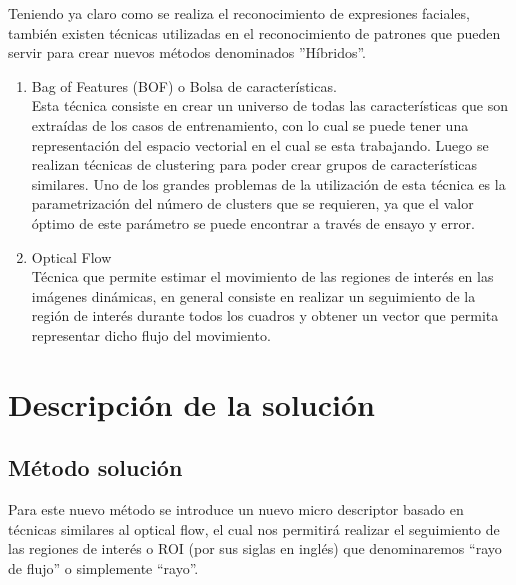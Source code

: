 \documentclass{article}
\begin{document}
    Teniendo ya claro como se realiza el reconocimiento de expresiones faciales, también existen técnicas utilizadas en el reconocimiento de patrones que pueden servir para crear nuevos métodos denominados ''Híbridos''.
    \begin{enumerate}
    \item Bag of Features (BOF) o Bolsa de características.\\
Esta técnica consiste en crear un universo de todas las características que son extraídas de los casos de entrenamiento, con lo cual se puede tener una representación del espacio vectorial en el cual se esta trabajando. Luego se realizan técnicas de clustering para poder crear grupos de características similares. 
Uno de los grandes problemas de la utilización de esta técnica es la parametrización del número de clusters que se requieren, ya que el valor óptimo de este parámetro se puede encontrar a través de ensayo y error. 
    \item Optical Flow\\
Técnica que permite estimar el movimiento de las regiones de interés en las imágenes dinámicas, en general consiste en realizar un seguimiento de la región de interés durante todos los cuadros y obtener un vector que permita representar dicho flujo del movimiento.
    \end{enumerate}


\section{Descripción de la solución}
\subsection{Método solución}

Para este nuevo método se introduce un nuevo micro descriptor basado en técnicas similares al optical flow, el cual nos permitirá realizar el seguimiento de las regiones de interés o ROI (por sus siglas en inglés) que denominaremos ``rayo de flujo'' o simplemente ``rayo''.
\end{document}
